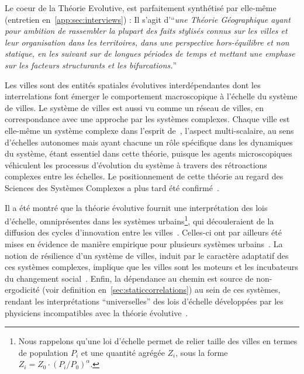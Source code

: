 Le coeur de la Théorie Evolutive, est parfaitement synthétisé par  elle-même (entretien en~\ref{app:sec:interviews}) : Il s'agit d'``\textit{une Théorie Géographique ayant pour ambition de rassembler la plupart des faits stylisés connus sur les villes et leur organisation dans les territoires, dans une perspective hors-équilibre et non statique, en les suivant sur de longues périodes de temps et mettant une emphase sur les facteurs structurants et les bifurcations.}''

Les villes sont des entités spatiales évolutives interdépendantes dont les interrelations font émerger le comportement macroscopique à l'échelle du système de villes. Le système de villes est aussi vu comme un réseau de villes, en correspondance avec une approche par les systèmes complexes. Chaque ville est elle-même un système complexe dans l'esprit de~\cite{berry1964cities}, l'aspect multi-scalaire, au sens d'échelles autonomes mais ayant chacune un rôle spécifique dans les dynamiques du système, étant essentiel dans cette théorie, puisque les agents microscopiques véhiculent les processus d'évolution du système à travers des rétroactions complexes entre les échelles. Le positionnement de cette théorie au regard des Sciences des Systèmes Complexes a plus tard été confirmé~\cite{pumain2003approche}.

Il a été montré que la théorie évolutive fournit une interprétation des lois d'échelle, omniprésentes dans les systèmes urbains\footnote{Nous rappelons qu'une loi d'échelle permet de relier taille des villes en termes de population $P_i$ et une quantité agrégée $Z_i$, sous la forme $Z_i = Z_0\cdot \left(P_i/P_0\right)^{\alpha}$.}, qui découleraient de la diffusion des cycles d'innovation entre les villes~\cite{pumain2006evolutionary}. Celles-ci ont par ailleurs été mises en évidence de manière empirique pour plusieurs systèmes urbains~\cite{pumain2009innovation}. La notion de résilience d'un système de villes, induit par le caractère adaptatif des ces systèmes complexes, implique que les villes sont les moteurs et les incubateurs du changement social~\cite{pumain2010theorie}. Enfin, la dépendance au chemin est source de non-ergodicité (voir definition en~\ref{sec:staticcorrelations}) au sein de ces systèmes, rendant les interprétations ``universelles'' des lois d'échelle développées par les physiciens incompatibles avec la théorie évolutive~\cite{pumain2010theorie}.




